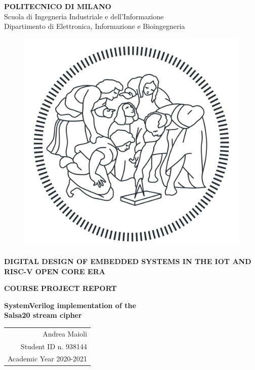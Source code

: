 \begin{titlepage}
    \begin{center}
        \large
        \textbf{POLITECNICO DI MILANO}\\
        Scuola di Ingegneria Industriale e dell’Informazione\\
        Dipartimento di Elettronica, Informazione e Bioingegneria\\
        \vspace{0.4cm}
        \begin{figure}[!h]
            \begin{center}
                \includegraphics[width=0.35\columnwidth]{logo_polimi.png}
            \end{center}
        \end{figure}

        \vspace{10mm}

        \huge\textbf{DIGITAL DESIGN OF EMBEDDED SYSTEMS IN THE IOT AND RISC-V OPEN CORE ERA}

        \vspace{25mm}

        \LARGE\textbf{COURSE PROJECT REPORT}

        \vspace{15mm}

        \LARGE\textbf{SystemVerilog implementation of the\\Salsa20 stream cipher}

        \vfill
        \hfill
        \begin{tabular}[t]{r@{}}
            Andrea Maioli\\
            Student ID n. 938144\\
            Academic Year 2020-2021
        \end{tabular}
    \end{center}
\end{titlepage}
\restoregeometry
